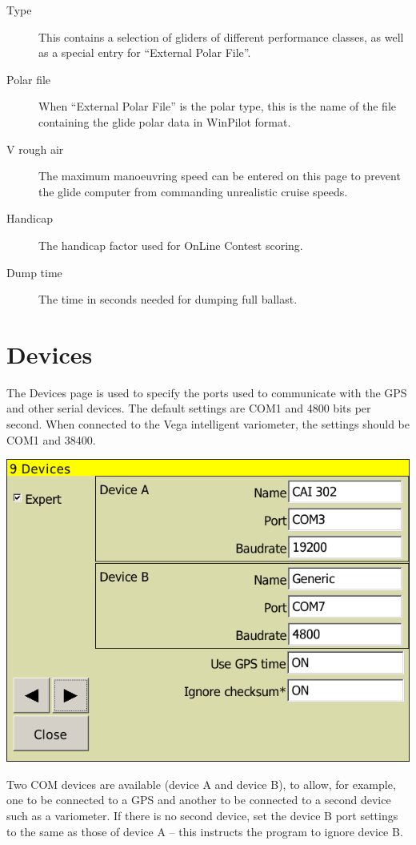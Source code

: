 \begin{description}
\item[Type]  \label{conf:polar} This contains a selection of gliders of
different performance classes, as well as a special entry for ``External Polar File''.  
\item[Polar file]  When ``External Polar File'' is the polar type, 
 this is the name of the file containing the glide polar data in WinPilot
 format.
\item[V rough air] The maximum manoeuvring speed can be entered on this page to prevent the glide computer from commanding unrealistic cruise speeds.
\item[Handicap] The handicap factor used for OnLine Contest scoring.
\item[Dump time] The time in seconds needed for dumping full ballast.
\end{description}

\clearpage
\section{Devices} \label{conf:comdevices}

The Devices page is used to specify the ports used to communicate with
the GPS and other serial devices. The default settings are COM1 and
4800 bits per second.  When connected to the Vega intelligent
variometer, the settings should be COM1 and 38400.

\begin{center}
\includegraphics[angle=0,width=0.8\linewidth,keepaspectratio='true']{figures/config-devices.png}
\end{center}

Two COM devices are available (device A and device B), to allow, for
example, one to be connected to a GPS and another to be connected to a
second device such as a variometer.  If there is no second device, set
the device B port settings to the same as those of device A -- this
instructs the program to ignore device B.

